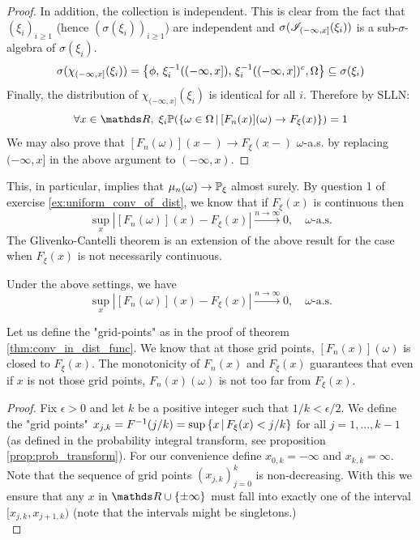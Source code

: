 \begin{unexaminable}
\begin{proof}
In addition, the collection is independent. This is clear from the fact that $(\xi_i)_{i \geq 1}$ (hence $(\sigma(\xi_i))_{i \geq 1}$) are independent and $\sigma(\mathcal{I}_{(-\infty,x]}(\xi_i))$ is a sub-$\sigma$-algebra of $\sigma(\xi_i)$. 
\begin{equation*}
    \sigma(\chi_{(-\infty,x]}(\xi_i)) = \left\{ \phi, \,  \xi_i^{-1}((-\infty,x]), \, \xi_i^{-1}((-\infty,x])^c, \Omega \right \} \subseteq \sigma(\xi_i)
\end{equation*}
Finally, the distribution of $\chi_{(-\infty, x]}(\xi_i)$ is identical for all $i$. Therefore by SLLN:
\begin{equation*}
    \forall x \in \R, \; \xi_i\p(\set{\omega \in \Omega \, | \, [F_n(x)](\omega) \to F_\xi(x)}) = 1
\end{equation*}
We may also prove that $[F_n(\omega)](x-) \to F_\xi(x-)$ $\omega$-a.s. by replacing $(-\infty,x]$ in the above argument to $(-\infty,x)$.
\end{proof}

This, in particular, implies that $\mu_n(\omega) \to \mathbb{P}_\xi$ almost surely. By question 1 of exercise \ref{ex:uniform_conv_of_dist}, we know that if $F_\xi(x)$ is continuous then
\begin{equation*}
    \sup_x |[F_n(\omega)](x) - F_\xi(x)| \overset{n\to\infty}\to 0, \quad \omega \text{-a.s.}
\end{equation*}
The Glivenko-Cantelli theorem is an extension of the above result for the case when $F_\xi(x)$ is not necessarily continuous.
\begin{theorem}
Under the above settings, we have 
\begin{equation*}
    \sup_x |[F_n(\omega)](x) - F_\xi(x)| \overset{n\to\infty}\to 0, \quad \omega \text{-a.s.}
\end{equation*}
\end{theorem}

\begin{hint}
Let us define the "grid-points" as in the proof of theorem \ref{thm:conv_in_dist_func}. We know that at those grid points, $[F_n(x)](\omega)$ is closed to $F_\xi(x)$. The monotonicity of $F_n(x)$ and $F_\xi(x)$ guarantees that even if $x$ is not those grid points, $F_n(x)(\omega)$ is not too far from $F_\xi(x)$.
\end{hint}

\begin{proof}
Fix $\epsilon > 0$ and let $k$ be a positive integer such that $1/k < \epsilon/2$. We define the "grid points" $x_{j,k} = F^{-1}(j/k) = \sup \left\{ x \,|\, F_\xi(x) < j/k \right \}$ for all $j = 1, ..., k-1$ (as defined in the probability integral transform, see proposition \ref{prop:prob_transform}). For our convenience define $x_{0,k} = -\infty$ and $x_{k,k} = \infty$. Note that the sequence of grid points $(x_{j,k})_{j=0}^k$ is non-decreasing. With this we ensure that any $x$ in $\R \cup \set{\pm \infty}$ must fall into exactly one of the interval $[x_{j,k},x_{j+1,k})$ (note that the intervals might be singletons.)\\


\end{proof}
\end{unexaminable}
